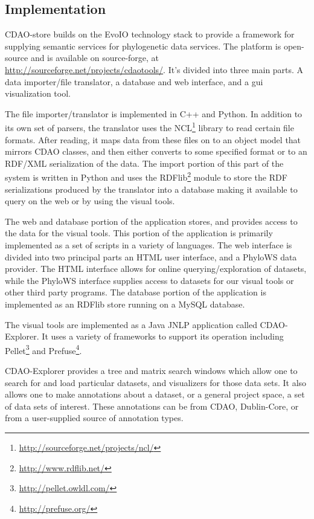 \documentclass[10pt]{bmc_article}
\newenvironment{bmcformat}{\begin{raggedright}\baselineskip20pt\sloppy\setboolean{publ}{false}}{\end{raggedright}\baselineskip20pt\sloppy}
\begin{document}
\begin{bmcformat}
\section*{Implementation}

CDAO-store builds on the EvoIO technology stack to provide a framework for supplying semantic services
for phylogenetic data services. The platform is open-source and is available on source-forge, at
\url{http://sourceforge.net/projects/cdaotools/}. It's divided into three main parts. A data importer/file translator,
a database and web interface, and a gui visualization tool. 

The file importer/translator is implemented in C++ and Python. In addition to its own set of parsers, 
the translator uses the NCL\footnote{\url{http://sourceforge.net/projects/ncl/}} library to read certain file formats.
After reading, it maps data from these files on to an object model that mirrors CDAO classes, and then either converts
to some specified format or to an RDF/XML serialization of the data. The import portion of this part of the system is
written in Python and uses the RDFlib\footnote{\url{http://www.rdflib.net/}} module to store the RDF serializations 
produced by the translator into a database making it available to query on the web or by using the visual tools.

The web and database portion of the application stores, and provides access to the data for the visual tools. This
portion of the application is primarily implemented as a set of scripts in a variety of languages. The web interface
is divided into two principal parts an HTML user interface, and a PhyloWS data provider. The HTML interface allows 
for online querying/exploration of datasets, while the PhyloWS interface supplies access to datasets for our visual
tools or other third party programs. The database portion of the application is implemented as an RDFlib store running
on a MySQL database. 

The visual tools are implemented as a Java JNLP application called CDAO-Explorer. It uses a variety of frameworks
to support its operation including Pellet\footnote{\url{http://pellet.owldl.com/}} and
  Prefuse\footnote{\url{http://prefuse.org/}}. 

CDAO-Explorer provides a tree and matrix search windows which allow one to search for and load particular datasets,
and visualizers for those data sets. It also allows one to make annotations about a dataset, or a general project space,
a set of data sets of interest. These annotations can be from CDAO, Dublin-Core, or from a user-supplied source of
annotation types.




\end{bmcformat}
\end{document}
